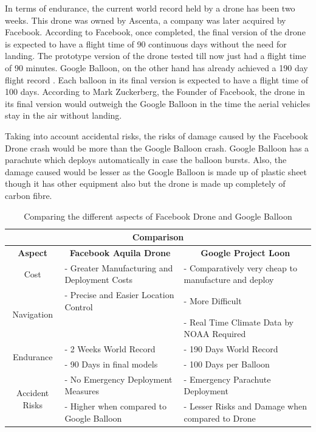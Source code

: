 \documentclass{llncs}
\begin{document}
    	In terms of endurance, the current world record held by a drone has been two weeks. This drone was owned by 
    	Ascenta, a company was later acquired by Facebook. According to Facebook, once completed, the final version 
    	of the drone is expected to have a flight time of 90 continuous days without the need for landing. The 
    	prototype version of the drone tested till now just had a flight
    	time of 90 minutes. Google Balloon, on the other hand has already achieved a 190 day flight record 
    	\cite{google_balloon_record}. Each balloon in its final version is expected to have a flight time of 100 days. According to 
    	Mark Zuckerberg, the Founder of Facebook, the drone in its final version would outweigh the Google Balloon in
    	the time the aerial vehicles stay in the air without landing. 
    	
    	Taking into account accidental risks, the risks of damage caused by the Facebook Drone crash would be more 
    	than the Google Balloon crash. Google Balloon has a parachute which deploys automatically in case the 
    	balloon bursts. Also, the damage caused would be lesser as the Google Balloon is made up of plastic sheet 
    	though it has other equipment also but the drone is made up completely of carbon fibre.           
	
	\begin{table}[h]
	\hskip-1.5cm
	\begin{tabular}{|c|l|l|}
    \hline
    \multicolumn{3}{|c|}{\textbf{Comparison}} \\
    \hline
    \multicolumn{1}{|c|}{\textbf{Aspect}} & \multicolumn{1}{c|}{\textbf{Facebook Aquila Drone}} & \multicolumn{1}{c|}{\textbf{Google Project Loon}} \\ \hline 
    Cost & - Greater Manufacturing and Deployment Costs & - Comparatively very cheap to manufacture and deploy \\ \hline
    \multirow{2}{*}{Navigation} & - Precise and Easier Location Control & - More Difficult \\
    &  & - Real Time Climate Data by NOAA Required \\ \hline
    \multirow{2}{*}{Endurance} & - 2 Weeks World Record\cite{drone_test_flights} & - 190 Days World Record\cite{google_balloon_record} \\
    & - 90 Days in final models & - 100 Days per Balloon \\ \hline
    \multirow{2}{*}{Accident Risks} & - No Emergency Deployment Measures & - Emergency Parachute Deployment \\
    & - Higher when compared to Google Balloon & - Lesser Risks and Damage when compared to Drone \\ \hline
    \end{tabular}
    \caption {Comparing the different aspects of Facebook Drone and Google Balloon}
    \label{tab:comparison}
    \end{table}
    
\end{document}
